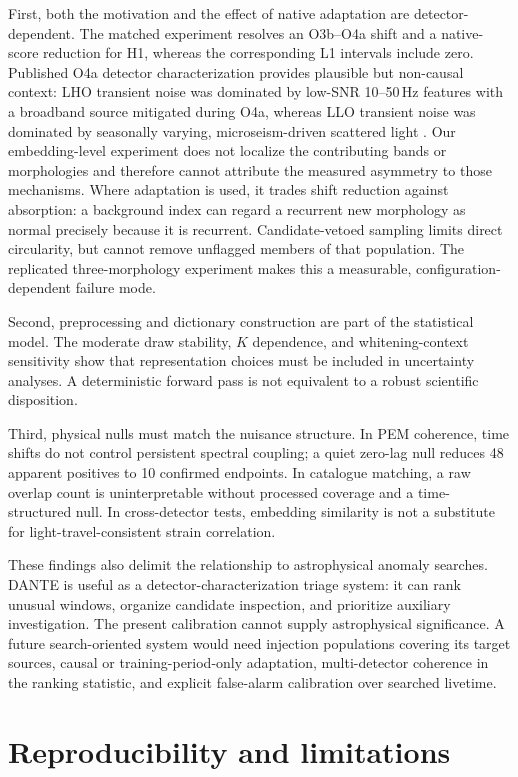 \documentclass[aps,prd,twocolumn,superscriptaddress,nofootinbib,amsmath,amssymb,floatfix,10pt]{revtex4-2}
\begin{document}
First, both the motivation and the effect of native adaptation are
detector-dependent.  The matched experiment resolves an O3b--O4a shift and a
native-score reduction for H1, whereas the corresponding L1 intervals include
zero.  Published O4a detector characterization provides plausible but
non-causal context: LHO transient noise was dominated by low-SNR 10--50\,Hz
features with a broadband source mitigated during O4a, whereas LLO transient
noise was dominated by seasonally varying, microseism-driven scattered light
\cite{soni2025}.  Our embedding-level experiment does not localize the
contributing bands or morphologies and therefore cannot attribute the measured
asymmetry to those mechanisms.  Where adaptation is used, it trades shift reduction against absorption:
a background index can regard a recurrent new morphology as normal precisely
because it is recurrent.  Candidate-vetoed sampling limits direct circularity,
but cannot remove unflagged members of that population.  The replicated
three-morphology experiment makes this a measurable, configuration-dependent
failure mode.

Second, preprocessing and dictionary construction are part of the statistical
model.  The moderate draw stability, $K$ dependence, and whitening-context
sensitivity show that representation choices must be included in uncertainty
analyses.  A deterministic forward pass is not equivalent to a robust
scientific disposition.

Third, physical nulls must match the nuisance structure.  In PEM coherence,
time shifts do not control persistent spectral coupling; a quiet zero-lag null
reduces 48 apparent positives to 10 confirmed endpoints.  In catalogue
matching, a raw overlap count is uninterpretable without processed coverage
and a time-structured null.  In cross-detector tests, embedding similarity is
not a substitute for light-travel-consistent strain correlation.

These findings also delimit the relationship to astrophysical anomaly
searches.  DANTE is useful as a detector-characterization triage system: it can
rank unusual windows, organize candidate inspection, and prioritize auxiliary
investigation.  The present calibration cannot supply astrophysical
significance.  A future search-oriented system would need injection populations
covering its target sources, causal or training-period-only adaptation,
multi-detector coherence in the ranking statistic, and explicit false-alarm
calibration over searched livetime.

\section{Reproducibility and limitations}
\end{document}
